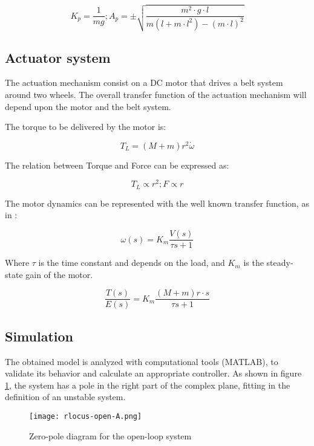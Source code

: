 \begin{equation} \label{dka2}
	K_p=\frac{1}{mg} ; A_p=\pm \sqrt{\frac{m^2\cdot g\cdot l}{m(l+m\cdot l^2)-(m\cdot l)^2}}
\end{equation}

\subsection{Actuator system}

The actuation mechanism consist on a DC motor that drives a belt system around two wheels. The overall transfer function of the actuation mechanism will depend upon the motor and the belt system.

The torque to be delivered by the motor is:

\begin{equation} \label{t}
	T_L=(M+m)r^2\dot{\omega}
\end{equation}

The relation between Torque and Force can be expressed as:

\begin{equation} \label{dtf}
	T_L\propto r^2 ; F\propto r
\end{equation}

The motor dynamics can be represented with the well known transfer function, as in \cite{SUL03} \cite{ZAC17}:

\begin{equation} \label{md}
	\omega(s)=K_m\frac{V(s)}{\tau s+1}
\end{equation}

Where $\tau$ is the time constant and depends on the load, and $K_m$ is the steady-state gain of the motor.

\begin{equation} \label{mtf}
	\frac{T(s)}{E(s)}=K_m\frac{(M+m)r\cdot s}{\tau s+1}
\end{equation}

\subsection{Simulation}

The obtained model is analyzed with computational tools (MATLAB), to validate its behavior and calculate an appropriate controller. As shown in figure \ref{fig:zpopenA}, the system has a pole in the right part of the complex plane, fitting in the definition of an unstable system.

\begin{figure}[h]
	\centering
	\texttt{[image: rlocus-open-A.png]}
	\caption{Zero-pole diagram for the open-loop system}\label{fig:zpopenA}
\end{figure}

